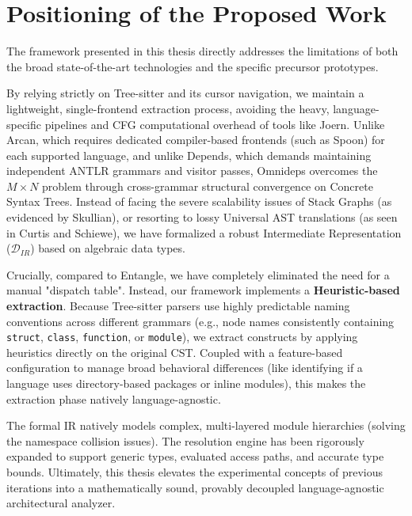 \section{Positioning of the Proposed Work}

The framework presented in this thesis directly addresses the
limitations of both the broad state-of-the-art technologies and the
specific precursor prototypes.

By relying strictly on Tree-sitter and its cursor navigation, we
maintain a lightweight, single-frontend extraction process, avoiding
the heavy, language-specific pipelines and CFG computational overhead
of tools like Joern. Unlike Arcan, which requires dedicated compiler-based
frontends (such as Spoon) for each supported language, and unlike Depends,
which demands maintaining independent ANTLR grammars and visitor passes,
Omnideps overcomes the $M \times N$ problem through cross-grammar structural
convergence on Concrete Syntax Trees. Instead of facing the severe
scalability issues of Stack Graphs (as evidenced by Skullian), or resorting
to lossy Universal AST translations (as seen in Curtis and Schiewe), we have
formalized a robust Intermediate Representation ($\mathcal{D}_{IR}$) based on
algebraic data types.

Crucially, compared to Entangle, we have completely eliminated the
need for a manual "dispatch table". Instead, our framework implements
a \textbf{Heuristic-based extraction}. Because Tree-sitter parsers
use highly predictable naming conventions across different grammars
(e.g., node names consistently containing \texttt{struct},
\texttt{class}, \texttt{function}, or \texttt{module}), we extract
constructs by applying heuristics directly on the original CST.
Coupled with a feature-based configuration to manage broad behavioral
differences (like identifying if a language uses directory-based
packages or inline modules), this makes the extraction phase natively
language-agnostic.

The formal IR natively models complex,
multi-layered module hierarchies (solving the namespace collision
issues). The resolution engine has been rigorously expanded to
support generic types, evaluated access paths, and accurate type
bounds. Ultimately, this thesis elevates the experimental concepts of
previous iterations into a mathematically sound, provably decoupled
language-agnostic architectural analyzer.
